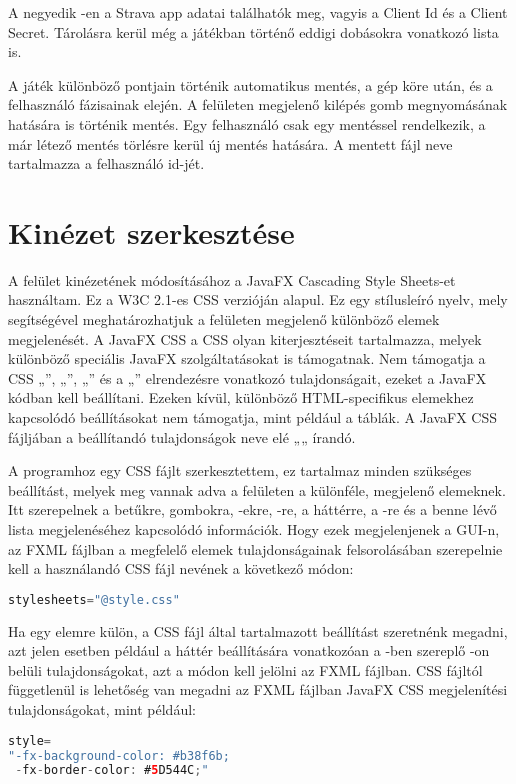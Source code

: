 A negyedik -en a Strava app adatai találhatók meg, vagyis a Client Id és a Client Secret.
Tárolásra kerül még a játékban történő eddigi dobásokra vonatkozó lista is. 

A játék különböző pontjain történik automatikus mentés, a gép köre után, és a felhasználó fázisainak elején.
A felületen megjelenő kilépés gomb megnyomásának hatására is történik mentés.
Egy felhasználó csak egy mentéssel rendelkezik, a már létező mentés törlésre kerül új mentés hatására.
A mentett fájl neve tartalmazza a felhasználó id-jét. 

\section{Kinézet szerkesztése}

A felület kinézetének módosításához a JavaFX Cascading Style Sheets-et használtam.
Ez a W3C 2.1-es CSS verzióján alapul. Ez egy stílusleíró nyelv, mely segítségével meghatározhatjuk a felületen megjelenő különböző elemek megjelenését.
A JavaFX CSS a CSS olyan kiterjesztéseit tartalmazza, melyek különböző speciális JavaFX szolgáltatásokat is támogatnak.
Nem támogatja a CSS „”, „”, „” és a „” elrendezésre vonatkozó tulajdonságait, ezeket a JavaFX kódban kell beállítani.
Ezeken kívül, különböző HTML-specifikus elemekhez kapcsolódó beállításokat nem támogatja, mint például a táblák.
A JavaFX CSS fájljában a beállítandó tulajdonságok neve elé „„ írandó. 

A programhoz egy CSS fájlt szerkesztettem, ez tartalmaz minden szükséges beállítást, melyek meg vannak adva a felületen a különféle, megjelenő elemeknek.
Itt szerepelnek a betűkre, gombokra, -ekre, -re, a háttérre, a -re és a benne lévő lista megjelenéséhez kapcsolódó információk.
Hogy ezek megjelenjenek a GUI-n, az FXML fájlban a megfelelő elemek tulajdonságainak felsorolásában szerepelnie kell a használandó CSS fájl nevének a következő módon:

\begin{lstlisting}[language=Java]
stylesheets="@style.css"
\end{lstlisting}


Ha egy elemre külön, a CSS fájl által tartalmazott  beállítást szeretnénk megadni, azt jelen esetben például a háttér beállítására vonatkozóan a -ben szereplő -on belüli tulajdonságokat, azt a  módon kell jelölni az FXML fájlban.
CSS fájltól függetlenül is lehetőség van megadni az FXML fájlban JavaFX CSS megjelenítési tulajdonságokat, mint például:

\begin{lstlisting}[language=Java]
style=
"-fx-background-color: #b38f6b;
 -fx-border-color: #5D544C;"
\end{lstlisting}
